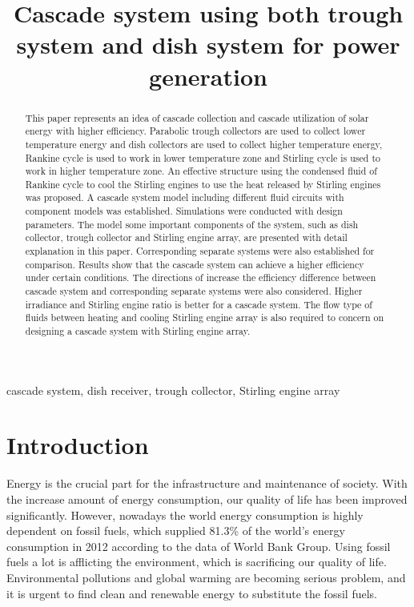 \documentclass{article}
\begin{document}
\title{Cascade system using both trough system and dish system for power generation}
\date{}
\author{}
\maketitle

\begin{abstract}
This paper represents an idea of cascade collection and cascade utilization of solar energy with higher efficiency. Parabolic trough collectors are used to collect lower temperature energy and dish collectors are used to collect higher temperature energy, Rankine cycle is used to work in lower temperature zone and Stirling cycle is used to work in higher temperature zone. An effective structure using the condensed fluid of Rankine cycle to cool the Stirling engines to use the heat released by Stirling engines was proposed. A cascade system model including different fluid circuits with component models was established. Simulations were conducted with design parameters. The model some important components of the system, such as dish collector, trough collector and Stirling engine array, are presented with detail explanation in this paper. Corresponding separate systems were also established for comparison. Results show that the cascade system can achieve a higher efficiency under certain conditions. The directions of increase the efficiency difference between cascade system and corresponding separate systems were also considered. Higher irradiance and Stirling engine ratio is better for a cascade system. The flow type of fluids between heating and cooling Stirling engine array is also required to concern on designing a cascade system with Stirling engine array.
\end{abstract}

 cascade system, dish receiver, trough collector, Stirling engine array
\newpage{}

\section{Introduction}

Energy is the crucial part for the infrastructure and maintenance of  society. With the increase amount of energy consumption, our quality of life has been improved significantly. However, nowadays the world energy consumption is highly dependent on fossil fuels, which supplied 81.3\% of the world's energy consumption in 2012 according to the data of World Bank Group. Using fossil fuels a lot is afflicting the environment, which is sacrificing our quality of life. Environmental pollutions and global warming are becoming serious problem, and it is urgent to find clean and renewable energy to substitute the fossil fuels.
\end{document}
